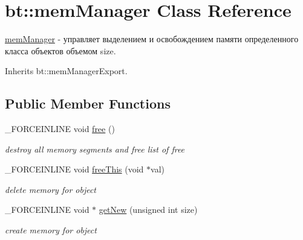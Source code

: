 \hypertarget{classbt_1_1mem_manager}{\section{bt\-:\-:mem\-Manager Class Reference}
\label{classbt_1_1mem_manager}
}


\hyperlink{classbt_1_1mem_manager}{mem\-Manager} -\/ управляет выделением и освобождением памяти определенного класса объектов объемом size.  




Inherits bt\-::mem\-Manager\-Export.

\subsection*{Public Member Functions}
\begin{DoxyCompactItemize}
\item 
\hypertarget{classbt_1_1mem_manager_a6f099b094a69d090a7ddac7b91e84073}{\-\_\-\-F\-O\-R\-C\-E\-I\-N\-L\-I\-N\-E void \hyperlink{classbt_1_1mem_manager_a6f099b094a69d090a7ddac7b91e84073}{free} ()}\label{classbt_1_1mem_manager_a6f099b094a69d090a7ddac7b91e84073}

\begin{DoxyCompactList}\small\item\em destroy all memory segments and free list of free \end{DoxyCompactList}\item 
\hypertarget{classbt_1_1mem_manager_a710c43f7e1bcaf0de6397d1d973e28c2}{\-\_\-\-F\-O\-R\-C\-E\-I\-N\-L\-I\-N\-E void \hyperlink{classbt_1_1mem_manager_a710c43f7e1bcaf0de6397d1d973e28c2}{free\-This} (void $\ast$val)}\label{classbt_1_1mem_manager_a710c43f7e1bcaf0de6397d1d973e28c2}

\begin{DoxyCompactList}\small\item\em delete memory for object \end{DoxyCompactList}\item 
\hypertarget{classbt_1_1mem_manager_a302bea057f53949acaf973fbda8b8b01}{\-\_\-\-F\-O\-R\-C\-E\-I\-N\-L\-I\-N\-E void $\ast$ \hyperlink{classbt_1_1mem_manager_a302bea057f53949acaf973fbda8b8b01}{get\-New} (unsigned int size)}\label{classbt_1_1mem_manager_a302bea057f53949acaf973fbda8b8b01}

\begin{DoxyCompactList}\small\item\em create memory for object \end{DoxyCompactList}\end{DoxyCompactItemize}


